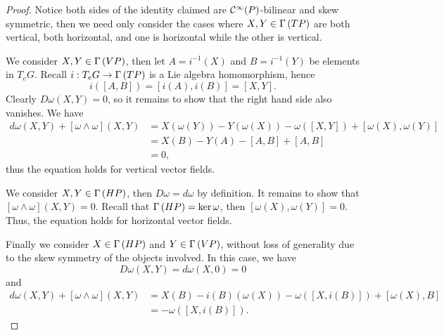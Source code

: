 \begin{proof}
    Notice both sides of the identity claimed are \(\mathcal{C}^\infty(P)\)-bilinear and skew symmetric, then we need only consider the cases where \(X, Y \in \Gamma\left(TP\right)\) are both vertical, both horizontal, and one is horizontal while the other is vertical.

     We consider \(X,Y \in \Gamma\left(VP\right)\), then let \(A = i^{-1}(X)\) and \(B = i^{-1}(Y)\) be elements in \(T_eG\). Recall \(i : T_eG \to \Gamma\left(TP\right)\) is a Lie algebra homomorphism, hence
    \begin{equation*}
        i([A,B]) = [i(A), i(B)] = [X,Y].
    \end{equation*}
    Clearly \(D\omega(X,Y) = 0\), so it remains to show that the right hand side also vanishes. We have
    \begin{align*}
        d\omega(X,Y) + [\omega \wedge \omega](X,Y) &= X(\omega(Y)) - Y(\omega(X)) - \omega([X,Y])+ [\omega(X), \omega(Y)]\\
                                                   &= X(B) - Y(A) - [A,B] + [A, B]\\
                                                   &= 0,
    \end{align*}
    thus the equation holds for vertical vector fields.

    We consider \(X, Y \in \Gamma\left(HP\right)\), then \(D\omega = d\omega\) by definition. It remains to show that \([\omega \wedge \omega](X,Y) = 0\). Recall that \(\Gamma\left(HP\right) = \ker \omega\), then \([\omega(X), \omega(Y)] = 0\). Thus, the equation holds for horizontal vector fields.

    Finally we consider \(X \in \Gamma\left(HP\right)\) and \(Y \in \Gamma\left(VP\right)\), without loss of generality due to the skew symmetry of the objects involved. In this case, we have
    \begin{equation*}
        D\omega(X, Y) = d\omega(X, 0) = 0
    \end{equation*}
    and
    \begin{align*}
        d\omega(X,Y) + [\omega \wedge \omega](X,Y) &= X(B) - i(B)(\omega(X)) - \omega([X, i(B)]) + [\omega(X), B]\\
                                                   &= -\omega([X,i(B)]).
    \end{align*}
\end{proof}

